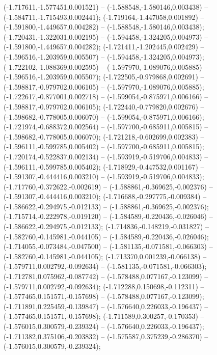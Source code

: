  (-1.717611,-1.577451,0.001521) -- (-1.588548,-1.580146,0.003438) -- (-1.584711,-1.715493,0.002441);
 (-1.719164,-1.447058,0.001892) -- (-1.591800,-1.449657,0.004282) -- (-1.588548,-1.580146,0.003438);
 (-1.720431,-1.322031,0.002195) -- (-1.594458,-1.324205,0.004973) -- (-1.591800,-1.449657,0.004282);
 (-1.721411,-1.202445,0.002429) -- (-1.596516,-1.203959,0.005507) -- (-1.594458,-1.324205,0.004973);
 (-1.722102,-1.088369,0.002595) -- (-1.597970,-1.089076,0.005885) -- (-1.596516,-1.203959,0.005507);
 (-1.722505,-0.979868,0.002691) -- (-1.598817,-0.979702,0.006105) -- (-1.597970,-1.089076,0.005885);
 (-1.722617,-0.877001,0.002718) -- (-1.599054,-0.875971,0.006166) -- (-1.598817,-0.979702,0.006105);
 (-1.722440,-0.779820,0.002676) -- (-1.598682,-0.778005,0.006070) -- (-1.599054,-0.875971,0.006166);
 (-1.721974,-0.688372,0.002564) -- (-1.597700,-0.685911,0.005815) -- (-1.598682,-0.778005,0.006070);
 (-1.721218,-0.602699,0.002383) -- (-1.596111,-0.599785,0.005402) -- (-1.597700,-0.685911,0.005815);
 (-1.720174,-0.522837,0.002134) -- (-1.593919,-0.519706,0.004833) -- (-1.596111,-0.599785,0.005402);
 (-1.718929,-0.447532,0.001167) -- (-1.591307,-0.444416,0.003210) -- (-1.593919,-0.519706,0.004833);
 (-1.717760,-0.372622,-0.002619) -- (-1.588861,-0.369625,-0.002376) -- (-1.591307,-0.444416,0.003210);
 (-1.716688,-0.297775,-0.009384) -- (-1.586622,-0.294975,-0.012133) -- (-1.588861,-0.369625,-0.002376);
 (-1.715714,-0.222978,-0.019120) -- (-1.584589,-0.220436,-0.026046) -- (-1.586622,-0.294975,-0.012133);
 (-1.714836,-0.148219,-0.031827) -- (-1.582760,-0.145981,-0.044105) -- (-1.584589,-0.220436,-0.026046);
 (-1.714055,-0.073484,-0.047500) -- (-1.581135,-0.071581,-0.066303) -- (-1.582760,-0.145981,-0.044105);
 (-1.713370,0.001239,-0.066138) -- (-1.579711,0.002792,-0.092634) -- (-1.581135,-0.071581,-0.066303);
 (-1.712781,0.075962,-0.087742) -- (-1.578488,0.077167,-0.123099) -- (-1.579711,0.002792,-0.092634);
 (-1.712288,0.150698,-0.112311) -- (-1.577465,0.151571,-0.157698) -- (-1.578488,0.077167,-0.123099);
 (-1.711891,0.225459,-0.139847) -- (-1.576640,0.226033,-0.196437) -- (-1.577465,0.151571,-0.157698);
 (-1.711589,0.300257,-0.170353) -- (-1.576015,0.300579,-0.239324) -- (-1.576640,0.226033,-0.196437);
 (-1.711382,0.375106,-0.203832) -- (-1.575587,0.375239,-0.286370) -- (-1.576015,0.300579,-0.239324);
